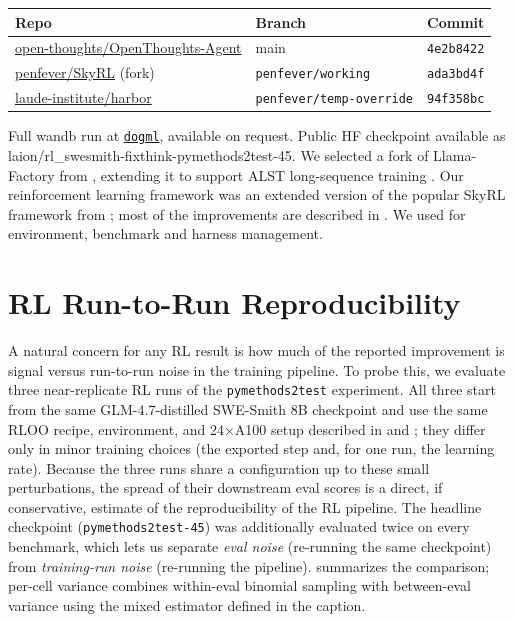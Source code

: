 \documentclass{llmxive}
\begin{document}
\begin{tabular}{lll}
\toprule
Repo & Branch & Commit \\
\midrule
\href{https://github.com/open-thoughts/OpenThoughts-Agent}{open-thoughts/OpenThoughts-Agent} & main                      & \texttt{4e2b8422} \\
\href{https://github.com/penfever/SkyRL}{penfever/SkyRL} (fork)                              & \texttt{penfever/working} & \texttt{ada3bd4f} \\
\href{https://github.com/laude-institute/harbor}{laude-institute/harbor}                    & \texttt{penfever/temp-override} & \texttt{94f358bc} \\
\bottomrule
\end{tabular}

Full wandb run at
\href{https://wandb.ai/dogml/OpenThoughts-Agent/runs/fpqklauc}{\texttt{dogml}}, available on request.
Public HF checkpoint available as laion/rl\_swesmith-fixthink-pymethods2test-45. 
We selected a fork of Llama-Factory from \citep{zheng-etal-2024-llamafactory}, extending it to support ALST long-sequence training \citep{bekman2025arcticlongsequencetraining}. Our reinforcement learning framework was an extended version of the popular SkyRL framework from \citep{griggs2025skrylv01}; most of the improvements are described in \cite{cao2025skyrl}. We used \cite{Harbor_Framework} for environment, benchmark and harness management.

\section{RL Run-to-Run Reproducibility}
\label{app:rl-repro}

A natural concern for any RL result is how much of the reported improvement is signal versus run-to-run noise in the training pipeline. To probe this, we evaluate three near-replicate RL runs of the \texttt{pymethods2test} experiment. All three start from the same GLM-4.7-distilled SWE-Smith 8B checkpoint and use the same RLOO recipe, environment, and 24$\times$A100 setup described in  and ; they differ only in minor training choices (the exported step and, for one run, the learning rate). Because the three runs share a configuration up to these small perturbations, the spread of their downstream eval scores is a direct, if conservative, estimate of the reproducibility of the RL pipeline. The headline checkpoint (\texttt{pymethods2test-45}) was additionally evaluated twice on every benchmark, which lets us separate \emph{eval noise} (re-running the same checkpoint) from \emph{training-run noise} (re-running the pipeline).  summarizes the comparison; per-cell variance combines within-eval binomial sampling with between-eval variance using the mixed estimator defined in the caption.
\end{document}
